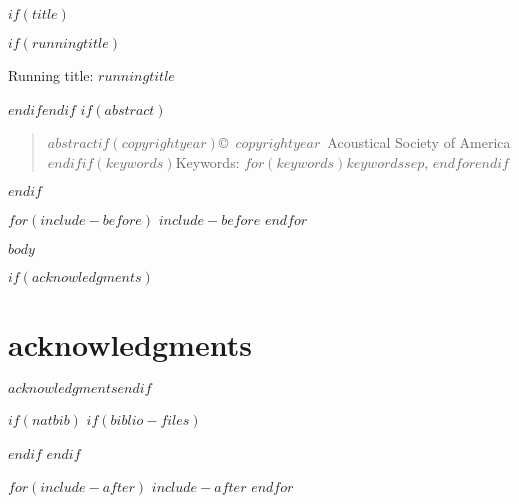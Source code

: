 \documentclass[$if(fontsize)$$fontsize$,$endif$$if(lang)$$lang$,$endif$$if(papersize)$$papersize$,$endif$$for(classoption)$$classoption$$sep$,$endfor$]{$documentclass$}
\affil{$for(author)$$author.email$$sep$, $endfor$}
\begin{document}
\doublespacing

$if(title)$\maketitle$if(runningtitle)$\begin{center}Running title: $runningtitle$\end{center}$endif$$endif$
\cleardoublepage
\linenumbers
$if(abstract)$\begin{abstract}\noindent $abstract$$if(copyrightyear)$\newline\bigskip \copyright~$copyrightyear$~Acoustical Society of America$endif$$if(keywords)$\newline\bigskip\bigskip Keywords: $for(keywords)$$keywords$$sep$, $endfor$$endif$\end{abstract}\cleardoublepage$endif$

$for(include-before)$
$include-before$
$endfor$

$body$

$if(acknowledgments)$\section*{acknowledgments}$acknowledgments$\cleardoublepage$endif$

$if(natbib)$
$if(biblio-files)$

$endif$
$endif$

\cleardoublepage
\processdelayedfloats
\cleardoublepage
\listoffigures

$for(include-after)$
$include-after$
$endfor$
\end{document}
